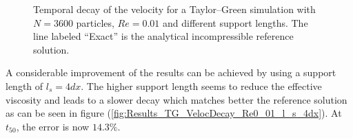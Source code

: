 \documentclass{report}
\begin{document}
\begin{figure}[h]
\centering
\label{fig:Results_TG_VelocDecay_Re0_01}
\caption[Velocity decay Taylor--Green at $Re=0.01$]{Temporal decay of the velocity for a Taylor--Green simulation with $N=3600$ particles, $Re=0.01$ and different support lengths. The line labeled ``Exact'' is the analytical incompressible reference solution.}
\end{figure}

A considerable improvement of the results can be achieved by using a support length of $l_s=4dx$. The higher support length seems to reduce the effective viscosity and leads to a slower decay which matches better the reference solution as can be seen in figure (\ref{fig:Results_TG_VelocDecay_Re0_01_l_s_4dx}). At $t_{50}$, the error is now $14.3\%$.
\end{document}
